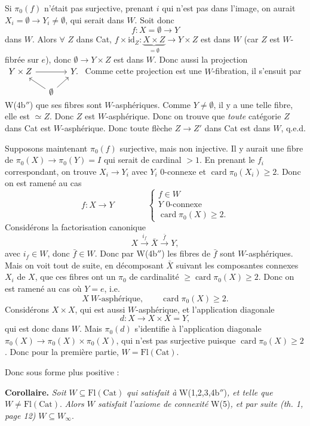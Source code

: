 \documentclass[11pt]{article}
\newcommand{\printedpage}[1]{\marginpar{\footnotesize p.~#1}}
\newcommand{\msp}[1]{\marginpar{\footnotesize [#1]}}
\newcommand{\Fl}{\mathrm{Fl}}
\newcommand{\Cat}{\mathrm{Cat}}
\newcommand{\card}{\operatorname{card}}
\begin{document}
Si $\pi_0(f)$ n'était pas surjective, prenant $i$ qui n'est pas dans l'image, on aurait $X_i = \emptyset \longrightarrow Y_i \neq \emptyset$, qui serait dans $W$. Soit donc
\[
f : X = \emptyset \longrightarrow Y
\]
dans $W$. Alors $\forall$ $Z$ dans Cat, $f \times \mathrm{id}_Z : \underbrace{X \times Z}_{= \emptyset} \longrightarrow Y \times Z$ est dans $W$ (car $Z$ est
\printedpage{18}
$W$-fibrée sur $e$), donc $\emptyset \longrightarrow Y \times Z$ est dans $W$. Donc aussi la projection
$\begin{tikzcd}[column sep=small, row sep=small, baseline=(\tikzcdmatrixname-1-1.base)]
Y \times Z \arrow[rr] & & Y. \\
& \emptyset \arrow[ul] \arrow[ur] &
\end{tikzcd}$
Comme cette projection est une $W$-fibration, il s'ensuit par W(4b$''$) que ses fibres sont $W$-asphériques. Comme $Y \neq \emptyset$, il y a une telle fibre, elle est $\simeq Z$. Donc $Z$ est $W$-asphérique. Donc on trouve que \textit{toute} catégorie $Z$ dans Cat est $W$-asphérique. Donc toute flèche $Z \longrightarrow Z'$ dans Cat est dans $W$, q.e.d.

Supposons maintenant $\pi_0(f)$ surjective, mais non injective. Il y aurait une fibre de $\pi_0(X) \longrightarrow \pi_0(Y) = I$ qui serait de cardinal $> 1$. En prenant le $f_i$ correspondant, on trouve $X_i \longrightarrow Y_i$ avec $Y_i$ 0-connexe et $\card \pi_0(X_i) \geq 2$. Donc on est ramené au cas
\[
f : X \longrightarrow Y \qquad\qquad \left\{
\begin{array}{l}
f \in W \\[1ex]
Y \text{ 0-connexe} \\[1ex]
\card \pi_0(X) \geq 2.
\end{array}
\right.
\]
Considérons la factorisation canonique
\[
X \xrightarrow{i_f} \bar{X} \xrightarrow{\bar{f}} Y,
\]
avec $i_f \in W$, donc $\bar{f} \in W$. Donc par W(4b$''$) les fibres de $\bar{f}$ sont $W$-asphériques. Mais on voit tout de suite, en décomposant $\bar{X}$ suivant les composantes connexes $X_i$ de $X$, que ces fibres ont un $\pi_0$ de cardinalité $\geq \card \pi_0(X) \geq 2$. Donc on est ramené au cas où $Y = e$, i.e.
\[
X \ W\text{-asphérique}, \qquad \card \pi_0(X) \geq 2.
\]
Considérons $X \times X$, qui est aussi $W$-asphérique, et l'application diagonale\msp{page 22}
\[
d : X \longrightarrow X \times X = Y,
\]
qui est donc dans $W$. Mais $\pi_0(d)$ s'identifie à l'application diagonale $\pi_0(X) \longrightarrow \pi_0(X) \times \pi_0(X)$, qui n'est pas surjective puisque $\card \pi_0(X) \geq 2$. Donc pour la première partie, $W = \Fl(\Cat)$.

Donc sous forme plus positive :

\textbf{Corollaire.} \textit{Soit} $W \subseteq \Fl(\Cat)$ \textit{qui satisfait à} W(1,2,3,4b$''$)\textit{, et telle que} $W \neq \Fl(\Cat)$. \textit{Alors $W$ satisfait l'axiome de connexité} W(5)\textit{, et par suite (th. 1, page 12)} $W \subseteq W_\infty$.
\end{document}
